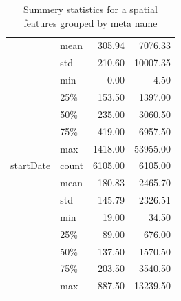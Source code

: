 \begin{table}
\begin{center}
\begin{tabular}{llrr}
            & mean &     305.94 &    7076.33 \\
            & std &     210.60 &   10007.35 \\
            & min &       0.00 &       4.50 \\
            & 25\% &     153.50 &    1397.00 \\
            & 50\% &     235.00 &    3060.50 \\
            & 75\% &     419.00 &    6957.50 \\
            & max &    1418.00 &   53955.00 \\
startDate & count &    6105.00 &    6105.00 \\
            & mean &     180.83 &    2465.70 \\
            & std &     145.79 &    2326.51 \\
            & min &      19.00 &      34.50 \\
            & 25\% &      89.00 &     676.00 \\
            & 50\% &     137.50 &    1570.50 \\
            & 75\% &     203.50 &    3540.50 \\
            & max &     887.50 &   13239.50 \\
\bottomrule
\end{tabular}

\caption{Summery statistics for a spatial features grouped by meta name}
\label{table:spatialDistr}
\end{center}
\end{table}  


\label{append}